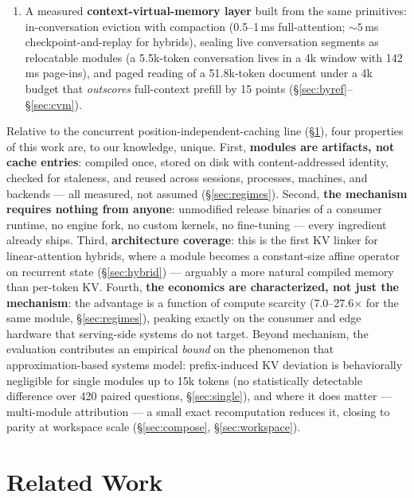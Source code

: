 \documentclass[11pt]{article}
\begin{document}
\begin{enumerate}
  \item A measured \textbf{context-virtual-memory layer} built from the same primitives: in-conversation eviction with compaction (0.5--1\,ms full-attention; ${\sim}5$\,ms checkpoint-and-replay for hybrids), sealing live conversation segments as relocatable modules (a 5.5k-token conversation lives in a 4k window with 142\,ms page-ins), and paged reading of a 51.8k-token document under a 4k budget that \emph{outscores} full-context prefill by 15 points (\S\ref{sec:byref}--\S\ref{sec:cvm}).
\end{enumerate}

Relative to the concurrent position-independent-caching line (\S\ref{sec:related}), four properties of this work are, to our knowledge, unique. First, \textbf{modules are artifacts, not cache entries}: compiled once, stored on disk with content-addressed identity, checked for staleness, and reused across sessions, processes, machines, and backends --- all measured, not assumed (\S\ref{sec:regimes}). Second, \textbf{the mechanism requires nothing from anyone}: unmodified release binaries of a consumer runtime, no engine fork, no custom kernels, no fine-tuning --- every ingredient already ships. Third, \textbf{architecture coverage}: this is the first KV linker for linear-attention hybrids, where a module becomes a constant-size affine operator on recurrent state (\S\ref{sec:hybrid}) --- arguably a more natural compiled memory than per-token KV. Fourth, \textbf{the economics are characterized, not just the mechanism}: the advantage is a function of compute scarcity (7.0--27.6$\times$ for the same module, \S\ref{sec:regimes}), peaking exactly on the consumer and edge hardware that serving-side systems do not target. Beyond mechanism, the evaluation contributes an empirical \emph{bound} on the phenomenon that approximation-based systems model: prefix-induced KV deviation is behaviorally negligible for single modules up to 15k tokens (no statistically detectable difference over 420 paired questions, \S\ref{sec:single}), and where it does matter --- multi-module attribution --- a small exact recomputation reduces it, closing to parity at workspace scale (\S\ref{sec:compose}, \S\ref{sec:workspace}).

\section{Related Work}
\label{sec:related}
\end{document}

